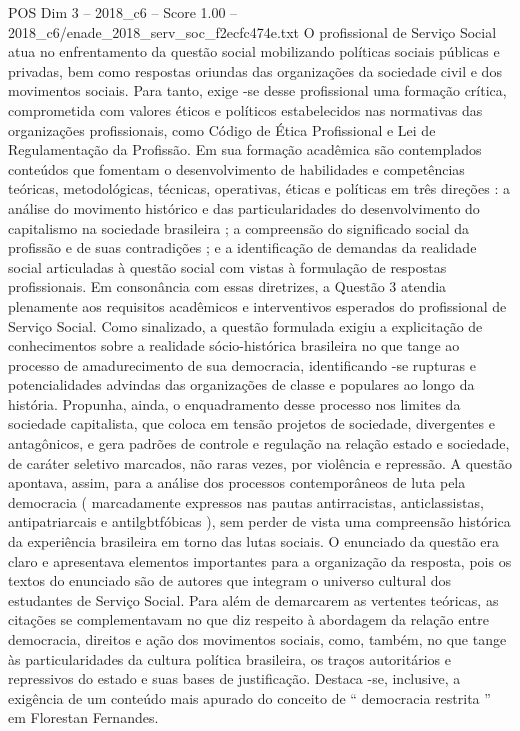 \begin{textsample}{POS Dim 3 – 2018\_c6 – Score 1.00 – 2018\_c6/enade\_2018\_serv\_soc\_f2ecfc474e.txt}
O profissional de Serviço Social atua no enfrentamento da questão social mobilizando políticas sociais públicas e privadas, bem como respostas oriundas das organizações da sociedade civil e dos movimentos sociais.
Para tanto, exige -se desse profissional uma formação crítica, comprometida com valores éticos e políticos estabelecidos nas normativas das organizações profissionais, como Código de Ética Profissional e Lei de Regulamentação da Profissão.
Em sua formação acadêmica são contemplados conteúdos que fomentam o desenvolvimento de habilidades e competências teóricas, metodológicas, técnicas, operativas, éticas e políticas em três direções : a análise do movimento histórico e das particularidades do desenvolvimento do capitalismo na sociedade brasileira ; a compreensão do significado social da profissão e de suas contradições ; e a identificação de demandas da realidade social articuladas à questão social com vistas à formulação de respostas profissionais.
Em consonância com essas diretrizes, a Questão 3 atendia plenamente aos requisitos acadêmicos e interventivos esperados do profissional de Serviço Social.
Como sinalizado, a questão formulada exigiu a explicitação de conhecimentos sobre a realidade sócio-histórica brasileira no que tange ao processo de amadurecimento de sua democracia, identificando -se rupturas e potencialidades advindas das organizações de classe e populares ao longo da história.
Propunha, ainda, o enquadramento desse processo nos limites da sociedade capitalista, que coloca em tensão projetos de sociedade, divergentes e antagônicos, e gera padrões de controle e regulação na relação estado e sociedade, de caráter seletivo marcados, não raras vezes, por violência e repressão.
A questão apontava, assim, para a análise dos processos contemporâneos de luta pela democracia ( marcadamente expressos nas pautas antirracistas, anticlassistas, antipatriarcais e antilgbtfóbicas ), sem perder de vista uma compreensão histórica da experiência brasileira em torno das lutas sociais.
O enunciado da questão era claro e apresentava elementos importantes para a organização da resposta, pois os textos do enunciado são de autores que integram o universo cultural dos estudantes de Serviço Social.
Para além de demarcarem as vertentes teóricas, as citações se complementavam no que diz respeito à abordagem da relação entre democracia, direitos e ação dos movimentos sociais, como, também, no que tange às particularidades da cultura política brasileira, os traços autoritários e repressivos do estado e suas bases de justificação.
Destaca -se, inclusive, a exigência de um conteúdo mais apurado do conceito de “ democracia restrita ” em Florestan Fernandes.

\end{textsample}
